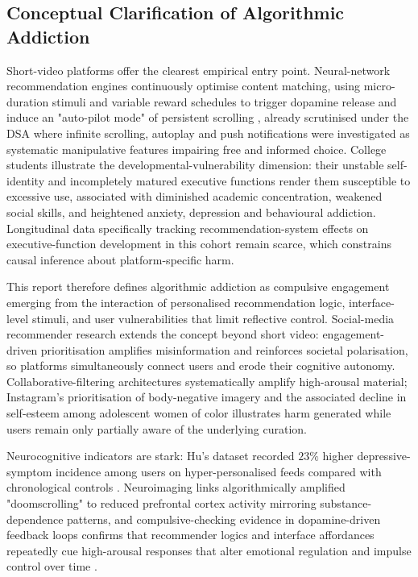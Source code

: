 \documentclass[11pt]{article}
\begin{document}
\subsection{Conceptual Clarification of Algorithmic Addiction}
\label{sec:conceptual_algorithmic_addiction} Short-video platforms offer the clearest empirical entry point. Neural-network recommendation engines continuously optimise content matching, using micro-duration stimuli and variable reward schedules to trigger dopamine release and induce an "auto-pilot mode" of persistent scrolling \parencites[2]{8958037}, already scrutinised under the DSA where infinite scrolling, autoplay and push notifications were investigated as systematic manipulative features impairing free and informed choice. College students illustrate the developmental-vulnerability dimension: their unstable self-identity and incompletely matured executive functions render them susceptible to excessive use, associated with diminished academic concentration, weakened social skills, and heightened anxiety, depression and behavioural addiction. Longitudinal data \parencites[2]{8958037} specifically tracking recommendation-system effects on executive-function development in this cohort remain scarce, which constrains causal inference about platform-specific harm.

This report therefore defines algorithmic addiction as compulsive engagement emerging from the interaction of personalised recommendation logic, interface-level stimuli, and user vulnerabilities that limit reflective control. Social-media recommender research extends the concept beyond short video: engagement-driven prioritisation \parencites[19]{3303310} amplifies misinformation and reinforces societal polarisation, so platforms simultaneously connect users and erode their cognitive autonomy. Collaborative-filtering architectures systematically amplify high-arousal material; Instagram's prioritisation of body-negative imagery and the associated decline in self-esteem among adolescent women of color illustrates harm generated while users remain only partially aware of the underlying curation.

Neurocognitive indicators are stark: Hu's dataset recorded $23\%$ higher depressive-symptom incidence among users on hyper-personalised feeds compared with chronological controls \parencites[2]{3303310}[2]{8958037}. Neuroimaging links algorithmically amplified "doomscrolling" \parencites[3]{3303310} to reduced prefrontal cortex activity mirroring substance-dependence patterns, and compulsive-checking evidence in dopamine-driven feedback loops confirms that recommender logics and interface affordances repeatedly cue high-arousal responses that alter emotional regulation and impulse control over time \parencites[2]{3303310}[2]{8958037}.
\end{document}
